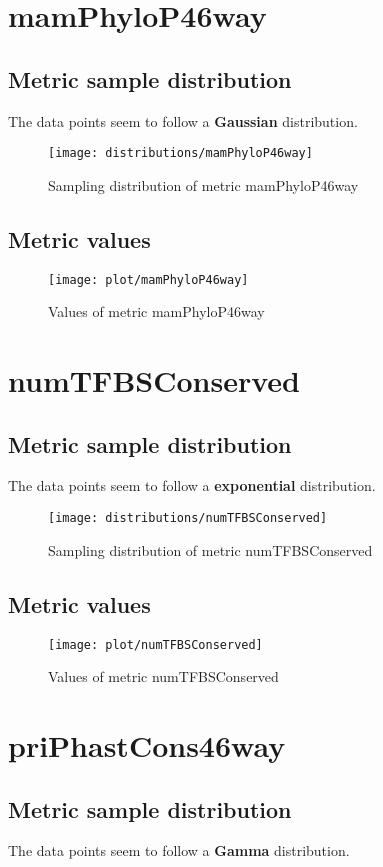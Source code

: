 \documentclass[\main/main.tex]{subfiles}
\begin{document}
\clearpage
\section{mamPhyloP46way}
\subsection{Metric sample distribution}
The data points seem to follow a \textbf{Gaussian} distribution.

\begin{figure}
  \texttt{[image: distributions/mamPhyloP46way]}
  \caption{Sampling distribution of metric mamPhyloP46way}
\end{figure}
\subsection{Metric values}
\begin{figure}
  \texttt{[image: plot/mamPhyloP46way]}
  \caption{Values of metric mamPhyloP46way}
\end{figure}

\clearpage
\section{numTFBSConserved}
\subsection{Metric sample distribution}
The data points seem to follow a \textbf{exponential} distribution.

\begin{figure}
  \texttt{[image: distributions/numTFBSConserved]}
  \caption{Sampling distribution of metric numTFBSConserved}
\end{figure}
\subsection{Metric values}
\begin{figure}
  \texttt{[image: plot/numTFBSConserved]}
  \caption{Values of metric numTFBSConserved}
\end{figure}

\clearpage
\section{priPhastCons46way}
\subsection{Metric sample distribution}
The data points seem to follow a \textbf{Gamma} distribution.
\end{document}
